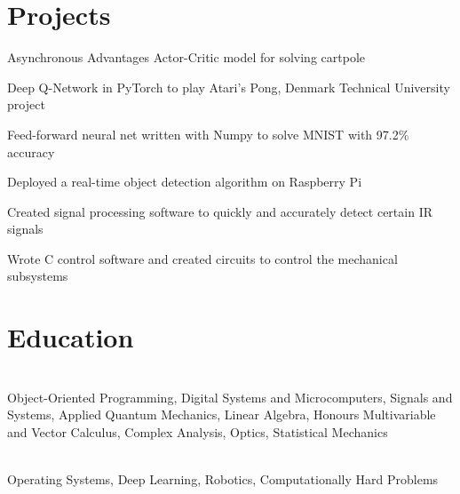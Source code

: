 \documentclass[]{deedy-resume-openfont}
\begin{document}
\section{Projects}

\begin{tightemize}
	\item Asynchronous Advantages Actor-Critic model for solving cartpole
    \item Deep Q-Network in PyTorch to play Atari's Pong, Denmark Technical University project
	\item Feed-forward neural net written with Numpy to solve MNIST with 97.2\% accuracy
\end{tightemize}

\vspace{8pt}

\begin{tightemize}
    \item Deployed a real-time object detection algorithm on Raspberry Pi
    \item Created signal processing software to quickly and accurately detect certain IR signals
    \item Wrote C control software and created circuits to control the mechanical subsystems
\end{tightemize}

\vspace{12pt}


\section{Education}

\begin{adjustwidth}{0.55cm}{1.25cm}
     \\
     Object-Oriented Programming, Digital Systems and Microcomputers, Signals and Systems, Applied Quantum Mechanics, Linear Algebra, Honours Multivariable and Vector Calculus, Complex Analysis, Optics, Statistical Mechanics
\end{adjustwidth}
\vspace{8pt}

\begin{adjustwidth}{0.55cm}{1.25cm}
     \\
     Operating Systems, Deep Learning, Robotics, Computationally Hard Problems
\end{adjustwidth}
\end{document}
